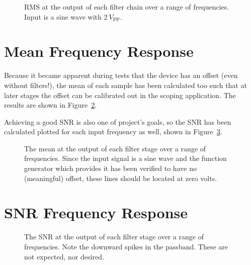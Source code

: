 \begin{figure}
    \centering
    
    \caption[RMS at Filter Chain Output]{%
        RMS  at   the  output   of  each   filter  chain   over  a   range  of
        frequencies. Input is a sine wave with $\SI{2}{V_{\mathrm{PP}}}$.%
    }
    \label{fig:verification:rmsAll}
\end{figure}


%
%
\section{Mean Frequency Response} %
\label{sec:verification:mean}

Because it  became apparent during tests  that the device has  an offset (even
without filters!), the  mean of each sample has been  calculated too such that
at later stages  the offset can be calibrated out  in the scoping application.
The results are shown in Figure~\ref{fig:verification:meanAll}.

Achieving  a  good  SNR is  also  one  of  project's  goals, so  the  SNR  has
been  calculated  plotted   for  each  input  frequency  as   well,  shown  in
Figure~\ref{fig:verification:snrAll}.

\begin{figure}
    \centering
    
    \caption[Mean at Filter Outputs]{%
        The  mean  at  the  output  of  each filter  stage  over  a  range  of
        frequencies.  Since the  input signal is a sine wave  and the function
        generator which provides it has  been verified to have no (meaningful)
        offset, these lines should be located at zero volts.%
    }
    \label{fig:verification:meanAll}
\end{figure}

\section{SNR Frequency Response}
\label{sec:verification:snr}


\begin{figure}
    \centering
    
    \caption[SNR at Filter Outputs]{%
        The  SNR  at  the  output  of  each  filter  stage  over  a  range  of
        frequencies.  Note the downward spikes  in the passband. These are not
        expected, nor desired.%
    }
    \label{fig:verification:snrAll}
\end{figure}

